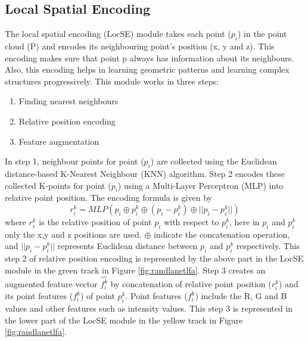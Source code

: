 \subsection{Local Spatial Encoding}
The local spatial encoding (LocSE) module takes each point ($p_i$) in the point cloud (P) and encodes its neighbouring point's position (x, y and z).
This encoding makes sure that point p always has information about its neighbours.
Also, this encoding helps in learning geometric patterns and learning complex structures progressively.
This module works in three steps:
\begin{enumerate}
    \item Finding nearest neighbours
    \item Relative position encoding
    \item Feature augmentation
\end{enumerate}

In step 1, neighbour points for point ($p_i$) are collected using the Euclidean distance-based K-Nearest Neighbour (KNN) algorithm.
Step 2 encodes these collected K-points for point ($p_i$) using a Multi-Layer Perceptron (MLP) into relative point position. The encoding formula is given by
$$
r_i^k = MLP(p_i \oplus p_i^k \oplus (p_i - p_i^k) \oplus ||p_i-p_i^k||)
$$
where $r_i^k$ is the relative position of point $p_i$ with respect to $p_i^k$, here in $p_i$ and $p_i^k$ only the x,y and z positions are used.
$\oplus$ indicate the concatenation operation, and $||p_i-p_i^k||$ represents Euclidean distance between $p_i$ and $p_i^k$ respectively.
This step 2 of relative position encoding is represented by the above part in the LocSE module in the green track in Figure \ref{fig:randlanetlfa}.
Step 3 creates an augmented feature vector $\hat{f_i^k}$ by concatenation of relative point position ($r_i^k$) and its point features ($f_i^k$) of point $p_i^k$.
Point features ($f_i^k$) include the R, G and B values and other features such as intensity values.
This step 3 is represented in the lower part of the LocSE module in the yellow track in Figure \ref{fig:randlanetlfa}.
